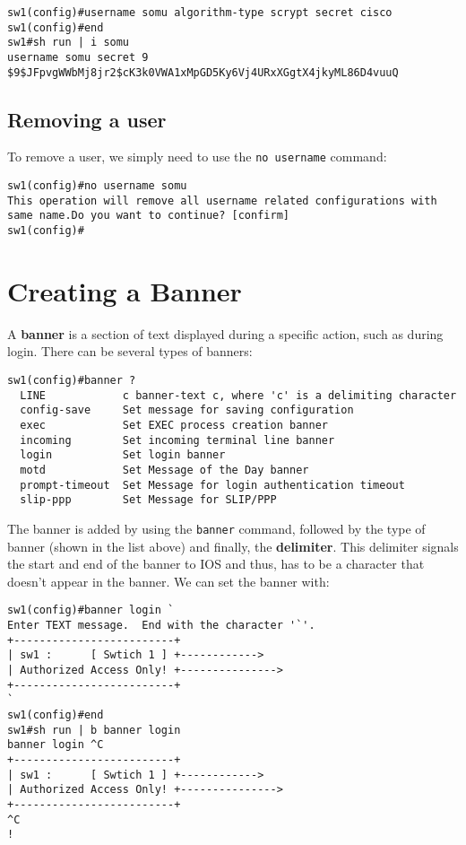 \vspace{-15pt}
\begin{verbatim}
sw1(config)#username somu algorithm-type scrypt secret cisco
sw1(config)#end
sw1#sh run | i somu
username somu secret 9 $9$JFpvgWWbMj8jr2$cK3k0VWA1xMpGD5Ky6Vj4URxXGgtX4jkyML86D4vuuQ
\end{verbatim}
\vspace{-10pt}

\subsection{Removing a user}
To remove a user, we simply need to use the \verb|no username| command: 

\vspace{-15pt}
\begin{verbatim}
sw1(config)#no username somu
This operation will remove all username related configurations with same name.Do you want to continue? [confirm]
sw1(config)#
\end{verbatim}

\section{Creating a Banner}
A \textbf{banner} is a section of text displayed during a specific action, such as during login. There can be several types of banners: 

\vspace{-15pt}
\begin{verbatim}
sw1(config)#banner ?
  LINE            c banner-text c, where 'c' is a delimiting character
  config-save     Set message for saving configuration
  exec            Set EXEC process creation banner
  incoming        Set incoming terminal line banner
  login           Set login banner
  motd            Set Message of the Day banner
  prompt-timeout  Set Message for login authentication timeout
  slip-ppp        Set Message for SLIP/PPP
\end{verbatim}
\vspace{-10pt}

\noindent
The banner is added by using the \verb|banner| command, followed by the type of banner (shown in the list above) and finally, the \textbf{delimiter}. This delimiter signals the start and end of the banner to IOS and thus, has to be a character that doesn't appear in the banner. We can set the banner with: 

\vspace{-15pt}
\begin{verbatim}
sw1(config)#banner login `
Enter TEXT message.  End with the character '`'.
+-------------------------+
| sw1 :      [ Swtich 1 ] +------------>
| Authorized Access Only! +--------------->
+-------------------------+
`
sw1(config)#end
sw1#sh run | b banner login
banner login ^C
+-------------------------+
| sw1 :      [ Swtich 1 ] +------------>
| Authorized Access Only! +--------------->
+-------------------------+
^C
!
\end{verbatim}
\vspace{-10pt}


